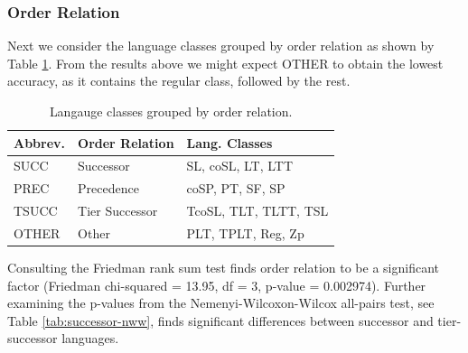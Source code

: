 \documentclass[twoside,11pt]{article}
\newcommand{\tbf}[1]{\textbf{#1}}
\begin{document}
\subsubsection{Order Relation}

Next we consider the language classes grouped by order relation as shown by Table \ref{tab:order-relation}. From the results above we might expect OTHER to obtain the lowest accuracy, as it contains the regular class, followed by the rest.

\begin{table}[ht]
  \centering
  \begin{tabular}{lll}
    \toprule
    \tbf{Abbrev.} & \tbf{Order Relation} & \tbf{Lang. Classes}   \\
    \midrule
    SUCC          & Successor            & SL, coSL, LT, LTT     \\
    PREC          & Precedence           & coSP, PT, SF, SP      \\
    TSUCC         & Tier Successor       & TcoSL, TLT, TLTT, TSL \\
    OTHER         & Other                & PLT, TPLT, Reg, Zp      \\
    \bottomrule
    \end{tabular}
    \caption{Langauge classes grouped by order relation.}
    \label{tab:order-relation}
\end{table}

Consulting the Friedman rank sum test finds order relation to be a significant factor (Friedman chi-squared = 13.95, df = 3, p-value = 0.002974). Further examining the p-values from the Nemenyi-Wilcoxon-Wilcox all-pairs test, see Table \ref{tab:successor-nww}, finds significant differences between successor and tier-successor languages.
\end{document}
